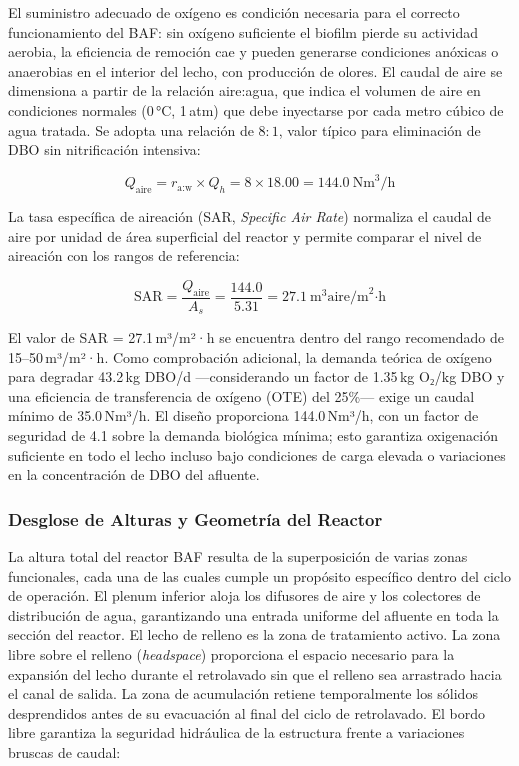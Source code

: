 El suministro adecuado de oxígeno es condición necesaria para el correcto funcionamiento del BAF: sin oxígeno suficiente el biofilm pierde su actividad aerobia, la eficiencia de remoción cae y pueden generarse condiciones anóxicas o anaerobias en el interior del lecho, con producción de olores. El caudal de aire se dimensiona a partir de la relación aire:agua, que indica el volumen de aire en condiciones normales (0\,°C, 1\,atm) que debe inyectarse por cada metro cúbico de agua tratada. Se adopta una relación de $8:1$, valor típico para eliminación de DBO sin nitrificación intensiva:

\begin{equation}
Q_{\text{aire}} = r_{\text{a:w}} \times Q_{h} = 8 \times 18.00 = 144.0\ \text{Nm}^3\text{/h}
\end{equation}

La tasa específica de aireación (SAR, \textit{Specific Air Rate}) normaliza el caudal de aire por unidad de área superficial del reactor y permite comparar el nivel de aireación con los rangos de referencia:

\begin{equation}
\text{SAR} = \frac{Q_{\text{aire}}}{A_{s}} = \frac{144.0}{5.31} = 27.1\ \text{m}^3\text{aire/m}^2\text{·h}
\end{equation}

El valor de SAR = 27.1\,m³/m²·h se encuentra dentro del rango recomendado de 15--50\,m³/m²·h. Como comprobación adicional, la demanda teórica de oxígeno para degradar 43.2\,kg DBO/d —considerando un factor de 1.35\,kg O₂/kg DBO y una eficiencia de transferencia de oxígeno (OTE) del 25\%— exige un caudal mínimo de 35.0\,Nm³/h. El diseño proporciona 144.0\,Nm³/h, con un factor de seguridad de 4.1 sobre la demanda biológica mínima; esto garantiza oxigenación suficiente en todo el lecho incluso bajo condiciones de carga elevada o variaciones en la concentración de DBO del afluente.

\subsubsection*{Desglose de Alturas y Geometría del Reactor}

La altura total del reactor BAF resulta de la superposición de varias zonas funcionales, cada una de las cuales cumple un propósito específico dentro del ciclo de operación. El plenum inferior aloja los difusores de aire y los colectores de distribución de agua, garantizando una entrada uniforme del afluente en toda la sección del reactor. El lecho de relleno es la zona de tratamiento activo. La zona libre sobre el relleno (\textit{headspace}) proporciona el espacio necesario para la expansión del lecho durante el retrolavado sin que el relleno sea arrastrado hacia el canal de salida. La zona de acumulación retiene temporalmente los sólidos desprendidos antes de su evacuación al final del ciclo de retrolavado. El bordo libre garantiza la seguridad hidráulica de la estructura frente a variaciones bruscas de caudal:

